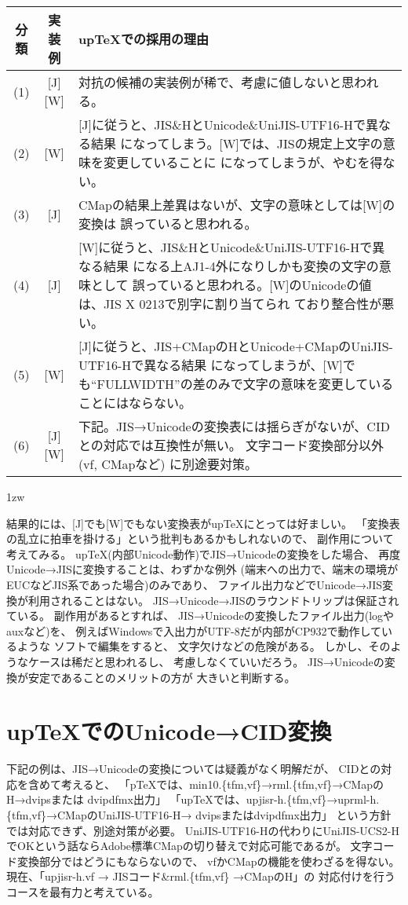 \documentclass{ujarticle}
\begin{document}
\parindent0mm
\begin{tabular}{ccp{145mm}}
分類 & 実装例 & upTeXでの採用の理由\\\hline
(1) & [J][W] & 対抗の候補の実装例が稀で、考慮に値しないと思われる。\\
(2) & [W] & [J]に従うと、JIS\&HとUnicode\&UniJIS-UTF16-Hで異なる結果
 になってしまう。[W]では、JISの規定上文字の意味を変更していることに
 になってしまうが、やむを得ない。\\
(3) & [J] & CMapの結果上差異はないが、文字の意味としては[W]の変換は
 誤っていると思われる。\\
(4) & [J] & [W]に従うと、JIS\&HとUnicode\&UniJIS-UTF16-Hで異なる結果
 になる上AJ1-4外になりしかも変換の文字の意味として
 誤っていると思われる。[W]のUnicodeの値は、JIS X 0213で別字に割り当てられ
 ており整合性が悪い。\\
(5) & [W] & [J]に従うと、JIS+CMapのHとUnicode+CMapのUniJIS-UTF16-Hで異なる結果
 になってしまうが、[W]でも``FULLWIDTH''の差のみで文字の意味を変更していることにはならない。\\
(6) & [J][W] & 下記。JIS→Unicodeの変換表には揺らぎがないが、CIDとの対応では互換性が無い。
 文字コード変換部分以外 (vf, CMapなど) に別途要対策。\\\hline
\end{tabular}

\parindent1zw

結果的には、[J]でも[W]でもない変換表がupTeXにとっては好ましい。
「変換表の乱立に拍車を掛ける」という批判もあるかもしれないので、
副作用について考えてみる。
upTeX(内部Unicode動作)でJIS→Unicodeの変換をした場合、
再度Unicode→JISに変換することは、わずかな例外
(端末への出力で、端末の環境がEUCなどJIS系であった場合)のみであり、
ファイル出力などでUnicode→JIS変換が利用されることはない。
JIS→Unicode→JISのラウンドトリップは保証されている。
副作用があるとすれば、
JIS→Unicodeの変換したファイル出力(logやauxなど)を、
例えばWindowsで入出力がUTF-8だが内部がCP932で動作しているような
ソフトで編集をすると、
文字欠けなどの危険がある。
しかし、そのようなケースは稀だと思われるし、
考慮しなくていいだろう。
JIS→Unicodeの変換が安定であることのメリットの方が
大きいと判断する。

\section{upTeXでのUnicode→CID変換}
下記の例は、JIS→Unicodeの変換については疑義がなく明解だが、
CIDとの対応を含めて考えると、
「pTeXでは、min10.\{tfm,vf\}→rml.\{tfm,vf\}→CMapのH→dvipsまたは
dvipdfmx出力」
「upTeXでは、upjisr-h.\{tfm,vf\}→uprml-h.\{tfm,vf\}→CMapのUniJIS-UTF16-H→
dvipsまたはdvipdfmx出力」
という方針では対応できず、別途対策が必要。
UniJIS-UTF16-Hの代わりにUniJIS-UCS2-HでOKという話ならAdobe標準CMapの切り替えで対応可能であるが。
文字コード変換部分ではどうにもならないので、
vfかCMapの機能を使わざるを得ない。
現在、「upjisr-h.vf → JISコード\&rml.\{tfm,vf\} →CMapのH」の
対応付けを行うコースを最有力と考えている。
\end{document}
